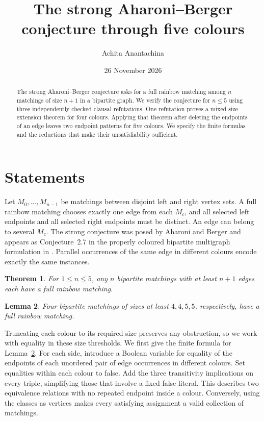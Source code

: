 \documentclass[10pt]{article}
\title{The strong Aharoni--Berger conjecture through five colours}
\author{Achita Anantachina}
\date{26 November 2026}
\newtheorem{theorem}{Theorem}
\newtheorem{lemma}[theorem]{Lemma}
\begin{document}
\maketitle

\begin{abstract}
The strong Aharoni--Berger conjecture asks for a full rainbow matching among
\(n\) matchings of size \(n+1\) in a bipartite graph. We verify the conjecture
for \(n\leq5\) using three independently checked clausal refutations. One
refutation proves a mixed-size extension theorem for four colours. Applying
that theorem after deleting the endpoints of an edge leaves two endpoint
patterns for five colours. We specify the finite formulas and the reductions
that make their unsatisfiability sufficient.
\end{abstract}

\section{Statements}
Let \(M_0,\ldots,M_{n-1}\) be matchings between disjoint left and right vertex
sets. A full rainbow matching chooses exactly one edge from each \(M_c\), and
all selected left endpoints and all selected right endpoints must be
distinct. An edge can belong to several \(M_c\). The strong conjecture was
posed by Aharoni and Berger \cite{ab} and appears as Conjecture~2.7 in the
properly coloured bipartite multigraph formulation in \cite{dp}. Parallel
occurrences of the same edge in different colours encode exactly the same
instances.

\begin{theorem}\label{thm:five}
For \(1\leq n\leq5\), any \(n\) bipartite matchings with at least \(n+1\) edges
each have a full rainbow matching.
\end{theorem}

\begin{lemma}\label{lem:mixed}
Four bipartite matchings of sizes at least \(4,4,5,5\), respectively, have a
full rainbow matching.
\end{lemma}

Truncating each colour to its required size preserves any obstruction, so
we work with equality in these size thresholds. We first give the finite
formula for Lemma~\ref{lem:mixed}. For each side, introduce a Boolean
variable for equality of the endpoints of each unordered pair of edge
occurrences in different colours. Set equalities within each colour to
false. Add the three transitivity implications on every triple, simplifying
those that involve a fixed false literal. This describes two equivalence
relations with no repeated endpoint inside a colour. Conversely, using
the classes as vertices makes every satisfying assignment a valid
collection of matchings.
\end{document}
